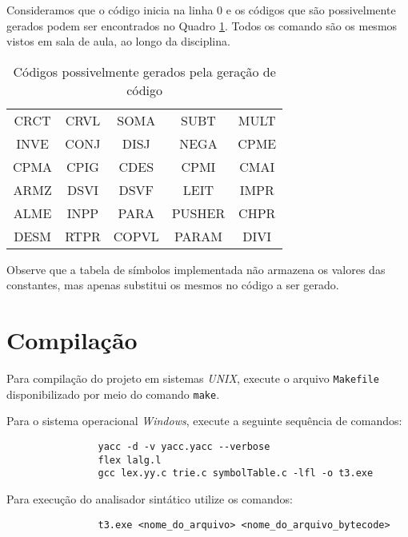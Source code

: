 \documentclass{article}
\begin{document}
		Consideramos que o código inicia na linha 0 e os códigos que são possivelmente gerados podem ser encontrados no Quadro \ref{tab:codigos}. Todos os comando são os mesmos vistos em sala de aula, ao longo da disciplina.

		\begin{table}[h]
			\centering	
			\ttfamily
			\begin{tabular}{c c c c c}
				\hline
				CRCT & CRVL & SOMA & SUBT & MULT \\
				INVE & CONJ & DISJ & NEGA & CPME \\
				CPMA & CPIG & CDES & CPMI & CMAI \\
				ARMZ & DSVI & DSVF & LEIT & IMPR \\
				ALME & INPP & PARA & PUSHER & CHPR \\
				DESM & RTPR & COPVL & PARAM & DIVI \\
				\hline
			\end{tabular}
			\caption{Códigos possivelmente gerados pela geração de código}
			\label{tab:codigos}
		\end{table}
	
	Observe que a tabela de símbolos implementada não armazena os valores das constantes, mas apenas substitui os mesmos no código a ser gerado.


\section{Compilação} %
\label{sec:compilacao}
	Para compilação do projeto em sistemas \emph{UNIX}, execute o arquivo \verb=Makefile= disponibilizado por meio do comando \verb=make=. 

	Para o sistema operacional \emph{Windows}, execute a seguinte sequência de comandos:

	\begin{center}
		\begin{minipage}[ht]{0.5\textwidth}
			\begin{verbatim}
				yacc -d -v yacc.yacc --verbose 
				flex lalg.l
				gcc lex.yy.c trie.c symbolTable.c -lfl -o t3.exe
			\end{verbatim}
		\end{minipage}
	\end{center}

	Para execução do analisador sintático utilize os comandos:

	\begin{center}
		\begin{minipage}[ht]{0.5\textwidth}
			\begin{verbatim}
				t3.exe <nome_do_arquivo> <nome_do_arquivo_bytecode>
			\end{verbatim}
		\end{minipage}
	\end{center}
\end{document}

